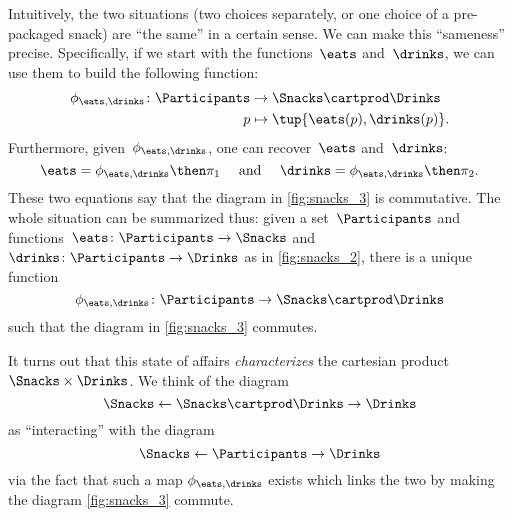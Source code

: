 Intuitively, the two situations (two choices separately, or one choice of a pre-packaged snack) are ``the same'' in a certain sense.
We can make this ``sameness'' precise.
Specifically, if we start with the functions~$\eats$ and~$\drinks$, we can use them to build the following function:
\begin{equation}
	\label{eq:snacks-building-univ-map}
	\begin{aligned}
		\phi_{\eats,\drinks}\colon \Participants & \to \Snacks\cartprod \Drinks       \\
		p                                        & \mapsto \tup{\eats(p),\drinks(p)}.
	\end{aligned}
\end{equation}
Furthermore, given~$\phi_{\eats,\drinks}$, one can recover~$\eats$ and~$\drinks$:
\begin{equation}
	\label{eq:snacks-proj-univ-map}
	\eats =\phi_{\eats,\drinks}\then \pi_1 \quad  \text{ and } \quad \drinks=\phi_{\eats,\drinks}\then \pi_2.
\end{equation}
These two equations say that the diagram in \cref{fig:snacks_3} is commutative.
The whole situation can be summarized thus: given a set~$\Participants$ and functions~$\eats\colon \Participants \to \Snacks$ and~$\drinks\colon \Participants \to \Drinks$ as in \cref{fig:snacks_2}, there is a unique function~
\begin{equation}
	\label{eq:snacks-unique-univ-map}
	\phi_{\eats,\drinks} \colon \Participants \to \Snacks \cartprod \Drinks
\end{equation}
such that the diagram in \cref{fig:snacks_3} commutes.

\begin{figure*}[h!]
	\centering
	\caption{Choosing food and drink separately is essentially the same as choosing a combination of the two. }
	\label{fig:snacks_3}
\end{figure*}

It turns out that this state of affairs \emph{characterizes} the cartesian product $\Snacks\times \Drinks$.
We think of the diagram
\begin{equation}
	\label{eq:snacks-prod-diagram}
	\Snacks \leftarrow \Snacks \cartprod \Drinks \rightarrow \Drinks
\end{equation}
as ``interacting'' with the diagram
\begin{equation}
	\label{eq:snacks-prod-test-diagram}
	\Snacks \leftarrow \Participants \rightarrow \Drinks
\end{equation}
via the fact that such a map $\phi_{\eats,\drinks}$ exists which links the two by making the diagram \cref{fig:snacks_3} commute.

